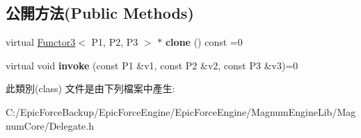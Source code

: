 \subsection*{公開方法(Public Methods)}
\begin{DoxyCompactItemize}
\item 
virtual \hyperlink{class_magnum_1_1_functor3}{Functor3}$<$ P1, P2, P3 $>$ $\ast$ {\bfseries clone} () const  =0\hypertarget{class_magnum_1_1_functor3_af6aa9a7b107611f6cad268309319d88e}{}\label{class_magnum_1_1_functor3_af6aa9a7b107611f6cad268309319d88e}

\item 
virtual void {\bfseries invoke} (const P1 \&v1, const P2 \&v2, const P3 \&v3)=0\hypertarget{class_magnum_1_1_functor3_af5b945b1149a03f98b16ec0ef3270483}{}\label{class_magnum_1_1_functor3_af5b945b1149a03f98b16ec0ef3270483}

\end{DoxyCompactItemize}


此類別(class) 文件是由下列檔案中產生\+:\begin{DoxyCompactItemize}
\item 
C\+:/\+Epic\+Force\+Backup/\+Epic\+Force\+Engine/\+Epic\+Force\+Engine/\+Magnum\+Engine\+Lib/\+Magnum\+Core/Delegate.\+h\end{DoxyCompactItemize}
